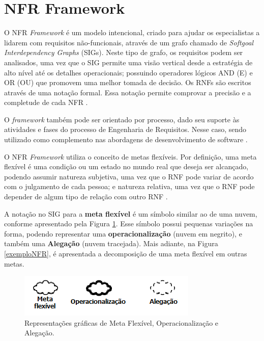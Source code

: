 \section{NFR Framework}
\label{sec:NFR}

O NFR \textit{Framework}  é um modelo intencional, criado para ajudar os especialistas a lidarem com requisitos não-funcionais, através de um grafo chamado de \textit{Softgoal Interdependency Graphs} (SIGs). Neste tipo de grafo, os requisitos podem ser analisados, uma vez que o SIG permite uma visão vertical desde a estratégia de alto nível até os detalhes operacionais;  possuindo operadores lógicos AND (E) e OR (OU) que promovem uma melhor tomada de decisão. Os RNFs são escritos através de uma notação formal. Essa notação permite comprovar a precisão e a completude de cada NFR \cite{chung2012non}. 

O \textit{framework} também pode ser orientado por processo, dado seu suporte às atividades e fases do processo de Engenharia de Requisitos. Nesse caso, sendo utilizado como complemento nas abordagens de desenvolvimento de software \cite{chung2012non}.

O NFR \textit{Framework} utiliza o conceito de metas  flexíveis. Por definição, uma meta flexível é uma condição ou um estado no mundo real que deseja ser alcançado, podendo assumir natureza subjetiva, uma vez que o RNF pode variar de acordo com o julgamento de cada pessoa; e natureza relativa, uma vez que o RNF pode depender de algum tipo de relação com outro RNF \cite{chung2012non}.

A notação no SIG para a \textbf{meta flexível} é um símbolo similar ao de uma nuvem, conforme apresentado pela Figura \ref{fig01}. Esse símbolo possui pequenas variações na forma, podendo representar uma \textbf{operacionalização} (nuvem em negrito), e também uma \textbf{Alegação} (nuvem tracejada). Mais adiante, na Figura \ref{exemploNFR}, é apresentada a decomposição de uma meta flexível em outras metas.  

\begin{figure}[h!]
	\centering
	\includegraphics[keepaspectratio=true,scale=0.9]{figuras/elementosSIG.png}
	\caption{Representações gráficas de Meta Flexível, Operacionalização e Alegação.}
	\label{fig01}
\end{figure} 

